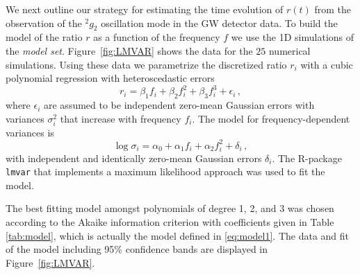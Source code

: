 We next outline our strategy for estimating the time evolution of $r(t)$
from the observation of the $\mbox{}^2g_2$ oscillation mode in the GW detector data.
To build the model of the ratio $r$ as a function of the frequency $f$ we use the 
1D simulations of the {\it model set}. Figure~\ref{fig:LMVAR}
shows the data for the $25$ numerical simulations. 
Using these data we parametrize the discretized ratio $r_i$ with a cubic polynomial
regression with heteroscedastic errors
\begin{equation}
\label{eq:model1}
r_i=\beta_1 f_i + \beta_2 f_i^2 +\beta_3 f_i^3 + \epsilon_i\,,
\end{equation}
where $\epsilon_i$ are assumed to be independent zero-mean Gaussian errors with
variances $\sigma_i^2$ that increase with frequency $f_i$. The model for frequency-dependent
variances is
\begin{equation}
\log \sigma_i=\alpha_0+ \alpha_1 f_i + \alpha_2 f_i^2 + \delta_i\,,
\end{equation}
with independent and identically zero-mean Gaussian errors $\delta_i$. The R-package \texttt{lmvar}
\cite{lmvar:2019}  that implements a maximum likelihood approach was used to fit the model.

The best fitting model amongst polynomials of degree 1, 2, and 3  was chosen according to
the Akaike information criterion with coefficients given in Table \ref{tab:model}, which is actually the model defined in \eqref{eq:model1}.  The data and fit of the model including 95\% confidence bands are displayed in
Figure~\ref{fig:LMVAR}.


